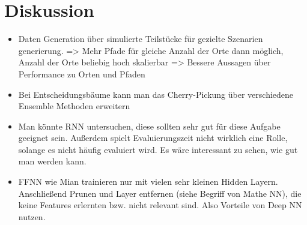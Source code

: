 \chapter{Diskussion}
\begin{itemize}
    \item Daten Generation über simulierte Teilstücke für gezielte Szenarien generierung. => Mehr Pfade für gleiche Anzahl der Orte dann möglich,
          Anzahl der Orte beliebig hoch skalierbar => Bessere Aussagen über Performance zu Orten und Pfaden
    \item Bei Entscheidungsbäume kann man das Cherry-Pickung über verschiedene Ensemble Methoden erweitern
    \item Man könnte RNN untersuchen, diese sollten sehr gut für diese Aufgabe geeignet sein. Außerdem spielt Evaluierungszeit nicht wirklich eine Rolle, solange es nicht häufig evaluiert wird.
          Es wäre interessant zu sehen, wie gut man werden kann.
    \item FFNN wie Mian trainieren nur mit vielen sehr kleinen Hidden Layern. Anschließend Prunen und Layer entfernen (siehe Begriff von Mathe NN), die keine Features erlernten bzw. nicht relevant sind.
          Also Vorteile von Deep NN nutzen.
\end{itemize}